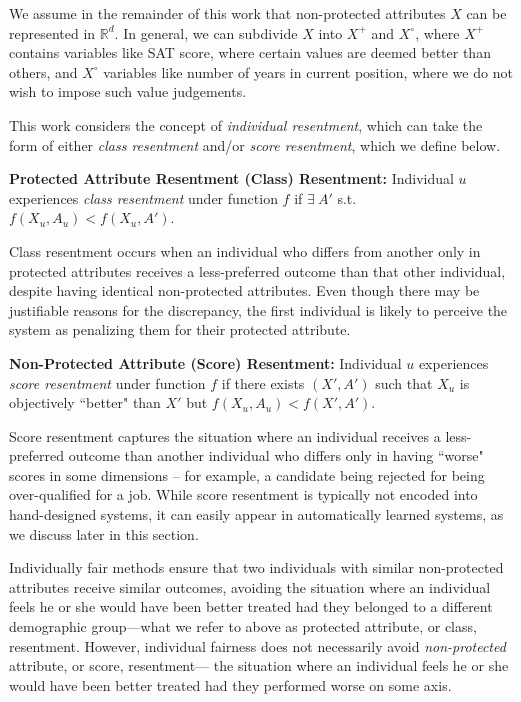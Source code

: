    We assume in the remainder of this work that non-protected attributes $X$ can be represented in $\mathbb{R}^d$. In general, we can subdivide $X$ into $X^+$ and $X^\circ$, where $X^+$ contains variables like SAT score, where certain values are deemed better than others, and $X^\circ$ variables like number of years in current position, where we do not wish to impose such value judgements. 

    This work considers the concept of \textit{individual resentment}, which can take the form of either {\it class resentment} and/or {\it score resentment}, which we define below. 
    
    \begin{defn} \label{def:ClassResentment}
        {\bf Protected Attribute Resentment (Class) Resentment:} Individual $u$ experiences {\it class resentment} under function $f$ if $\exists~A'$ s.t. $f(X_u, A_u) < f(X_u, A')$.
    \end{defn}
    Class resentment occurs when an individual who differs from another only in protected attributes receives a less-preferred outcome than that other individual, despite having identical non-protected attributes.  Even though there may be justifiable reasons for the discrepancy, the first individual is likely to perceive the system as penalizing them for their protected attribute.

    \begin{defn} \label{def:ScoreResentment}
        {\bf Non-Protected Attribute (Score) Resentment:} Individual $u$ experiences {\it score resentment} under function $f$ if there exists $(X', A')$ such that $X_u$ is objectively ``better" than $X'$ but $f(X_u, A_u) < f(X', A')$.
    \end{defn}
    
    Score resentment captures the situation where an individual receives a less-preferred outcome than another individual who differs only in having ``worse" scores in some dimensions -- for example, a candidate being rejected for being over-qualified for a job. While score resentment is typically not encoded into hand-designed systems, it can easily appear in automatically learned systems, as we discuss later in this section.

    Individually fair methods ensure that two individuals with similar non-protected attributes receive similar outcomes, avoiding the situation where an individual feels he or she would have been better treated had they belonged to a different demographic group---what we refer to above as protected attribute, or class, resentment. However, individual fairness does not necessarily avoid \textit{non-protected} attribute, or score, resentment--- the situation where an individual feels he or she would have been better treated had they performed worse on some axis. 
    
